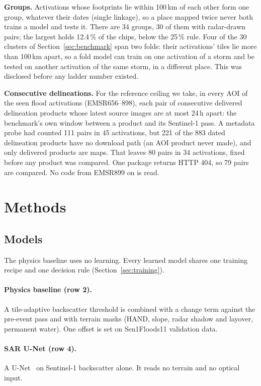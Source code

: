 \documentclass[10pt,twocolumn,a4paper]{article}
\newcommand{\pp}{\,\%}
\begin{document}
\textbf{Groups.} Activations whose footprints lie within 100\,km of each other form one group, whatever their dates
(single linkage), so a place mapped twice never both trains a model and tests it. There are 34 groups, 30 of them
with radar-drawn pairs; the largest holds 12.4\pp{} of the chips, below the 25\pp{} rule. Four of the 30 clusters of
Section~\ref{sec:benchmark} span two folds: their activations' tiles lie more than 100\,km apart, so a fold model can
train on one activation of a storm and be tested on another activation of the same storm, in a different place. This
was disclosed before any ladder number existed.

\textbf{Consecutive delineations.} For the reference ceiling we take, in every AOI of the seen flood activations
(EMSR656--898), each pair of consecutive delivered delineation products whose latest source images are at most
24\,h apart: the benchmark's own window between a product and its Sentinel-1 pass. A metadata probe had counted 111
pairs in 45 activations, but 221 of the 883 dated delineation products have no download path (an AOI product never
made), and only delivered products are maps. That leaves 80 pairs in 34 activations, fixed before any product was
compared. One package returns HTTP 404, so 79 pairs are compared. No code from EMSR899 on is read.

\section{Methods}\label{sec:methods}

\subsection{Models}
The physics baseline uses no learning. Every learned model shares one training recipe and one decision rule
(Section~\ref{sec:training}).

\paragraph{Physics baseline (row 2).} A tile-adaptive backscatter threshold is combined with a change term against the
pre-event pass and with terrain masks (HAND, slope, radar shadow and layover, permanent water). One offset is set on
Sen1Floods11 validation data.

\paragraph{SAR U-Net (row 4).} A U-Net~\citep{ronneberger2015unet} on Sentinel-1 backscatter alone. It reads no
terrain and no optical input.
\end{document}
